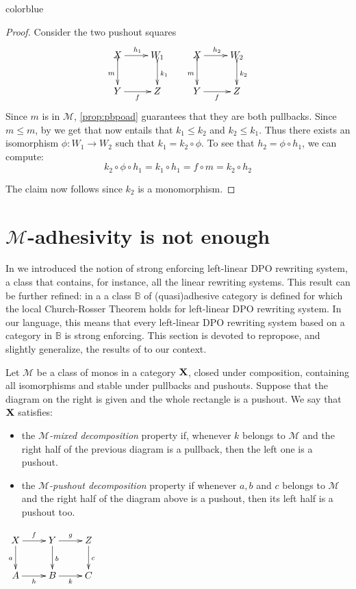 \documentclass[a4paper,UKenglish,cleveref,pdftex,thm-restate,numberwithinsect,anonymous]{lipics}
\newcommand{\full}[1]{{color{blue}#1}}
\newcommand{\full}[1]{}
\def\X{\textbf {\textup{X}}}
\def\Y{\textbf {\textup{Y}}}
\begin{document}
\full{ 
\begin{proof}
	Consider the two pushout squares
	\[\xymatrix{X \ar[r]^{h_1}\ar@{>->}[d]_{m}& W_1 \ar@{>->}[d]^{k_1} & X \ar@{>->}[d]_{m} \ar[r]^{h_2}& W_2 \ar@{>->}[d]^{k_2}\\Y\ar[r]_{f}&Z &Y \ar[r]_{f}&Z}\]
	Since $m$ is in $\mathcal{M}$, \cref{prop:pbpoad} guarantees that they are both pullbacks.
	Since $m\leq m$, by \Cref{lem:radj} we get that now entails that $k_1\leq k_2$ and $k_2\leq k_1$. Thus there exists an isomorphism $\phi\colon W_1\to W_2$ such that $k_1=k_2\circ \phi$. To see that $h_2=\phi\circ h_1$, we can compute:
	\[
		k_2\circ \phi \circ h_1  = k_1\circ h_1= f\circ m= k_2\circ h_2\]

	The claim now follows since $k_2$ is a monomorphism.
\end{proof}}



\section{$\mathcal{M}$-adhesivity is not enough}\label{app:fill}
In  we introduced the notion of strong enforcing left-linear DPO rewriting system, a class that contains, for instance, all the linear rewriting systems. This result can be further refined: in a\cite{baldan2011adhesivity} a class  $\mathbb{B}$ of (quasi)adhesive category is defined for which the local Church-Rosser Theorem holds for left-linear DPO rewriting system. In our language, this means that every left-linear DPO rewriting system based on a category in $\mathbb{B}$ is strong enforcing. This section is devoted to repropose, and slightly generalize, the results of \cite{baldan2011adhesivity} to our context.

\noindent
\parbox{10.4cm}{
	\begin{definition}Let $\mathcal{M}$ be a class of monos in a category $\X$, closed under composition, containing all isomorphisms and stable under pullbacks and pushouts. Suppose that the  diagram on the right 	is given and the whole rectangle is a pushout. We say that $\X$ satisfies:
		\parbox{14cm}{\begin{itemize}
				\item the \emph{$\mathcal{M}$-mixed decomposition} property if, whenever $k$ belongs to $\mathcal{M}$ and the right half of the previous diagram is a pullback, then the left one is a pushout.
				\item the \emph{$\mathcal{M}$-pushout decomposition} property if whenever $a, b$ and $c$ belongs to $\mathcal{M}$ and the right half of the diagram above is a pushout, then its left half is a pushout too.
			\end{itemize}}
	\end{definition}} \parbox{3cm}{\vspace{-2cm}$\xymatrix{X \ar[d]_{a} \ar[r]^{f}& \ar[r]^{g} Y \ar[d]^{b}& Z \ar[d]^{c}\\ A \ar[r]_{h}& B \ar[r]_{k}& C}$}\\
\end{document}
